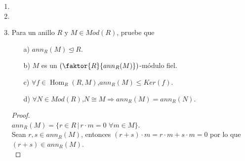 \documentclass{article}
\begin{document}
\begin{enumerate}[label=\textbf{Ej \arabic*.}]
\begin{proof}
Como $n\Z=p_1^{m_1}\ldots p_k^{m_k}\Z$ entonces $\faktor{\Z}{n\Z}=\faktor{\Z}{p_1^{m_1}\ldots p_k^{m_k}\Z}$, en particular 
$\faktor{\Z}{p_j\Z}\leq \faktor{\Z}{n\Z}$ es simple para toda $j\in \{1,\ldots , k\}$, pues $p_j\Z\geq n\Z$.\\
Por otra parte si $M$ es simple en $\faktor{\Z}{n\Z}$, entonces $M=\faktor{\Z}{p\Z}$ para algún $p$ primo y $p\Z\geq n\Z$, por lo que $p|n$
es decir, existe $j\in \{1,\ldots , k\}$ tal que $p|p_j^{m_j}$, entonces $p=p_j$ y así $M=\faktor{\Z}{p_j\Z}$ para algún  $j\in \{1,\ldots , k\}$.
Por lo tanto, como $p_j\Z\geq n\Z$ para toda $j\in \{1,\ldots , k\}$,
\[ Soc\left(\faktor{\Z}{n\Z}\right)\cong \displaystyle\sum_{i\leq k}
\faktor{\Z}{p_j\Z}=\displaystyle\bigoplus_{j\leq k}\faktor{\Z}{p_j\Z}\cong \faktor{\Z}{(p_1\ldots p_k)\Z}.\]
\end{proof}

\item
\item
\item Para un anillo $R$ y $M\in Mod(R)$, pruebe que 
\begin{itemize}
\item[a)] $ann_R(M)\unlhd R$.
\item[b)] $M$ es un $\left(\faktor{R}{ann_R(M)}\right)$-módulo fiel.
\item[c)] $\forall f\in \operatorname{Hom}_R(R,M)$,\quad $ann_R(M)\leq Ker(f)$.
\item[d)] $\forall N\in Mod(R)$,\quad $N\cong M\Longrightarrow ann_R(M)=ann_R(N)$.
\end{itemize}
\begin{proof}
\\
$ann_R(M)=\{r\in R\,|\,r\cdot m=0\,\,\forall m\in M\}$.\\
Sean $r,s\in ann_R(M)$, entonces $(r+s)\cdot m=r\cdot m+s\cdot m=0$ por lo que $(r+s)\in ann_R(M)$.\\


\end{proof}
\end{enumerate}
\end{document}
